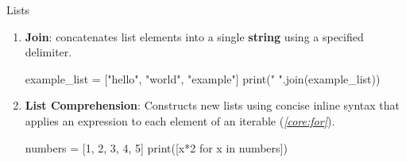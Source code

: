 \documentclass[10pt]{article}
\begin{document}
\begin{core}{Lists}
\begin{enumerate}
        \begin{pyconsole}

          example_list = [3, 1, 4, 1, 5, 9]
          example_list.sort() # ascending order
          print(example_list)

        \end{pyconsole}

        \item \textbf{Join}:  concatenates list elements into a single \textbf{string} using a specified delimiter.

        \begin{pyconsole}

          example_list = ["hello", "world", "example"]
          print(" ".join(example_list))

        \end{pyconsole}

        \item \textbf{List Comprehension}: Constructs new lists using concise inline syntax that applies an expression to each element of an iterable (\textit{\autoref{core:for}}).

        \begin{pyconsole}

          numbers = [1, 2, 3, 4, 5]
          print([x*2 for x in numbers])

        \end{pyconsole}

      \end{enumerate}

    \end{core}
\end{document}
